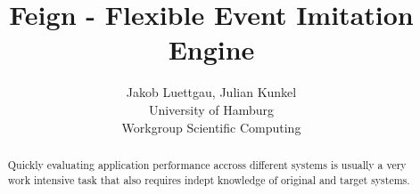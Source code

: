 \documentclass[]{article}
\title{\textbf{Feign - Flexible Event Imitation Engine}} %
\author{
	{Jakob Luettgau}, {Julian Kunkel} \\
	\normalsize{University of Hamburg} \\
	\normalsize{Workgroup Scientific Computing} \\
}
\date{}
\begin{document}
	\maketitle

	\begin{abstract}
		Quickly evaluating application performance accross different systems
		is usually a very work intensive task that also requires indept 
		knowledge of original and target systems. 
	\end{abstract}

	\begin{multicols}{2}
		
		\lipsum[2-3]
		\lipsum[2-3]
		\lipsum[2-3]
		\lipsum[2-3]


	\end{multicols}
\end{document}
